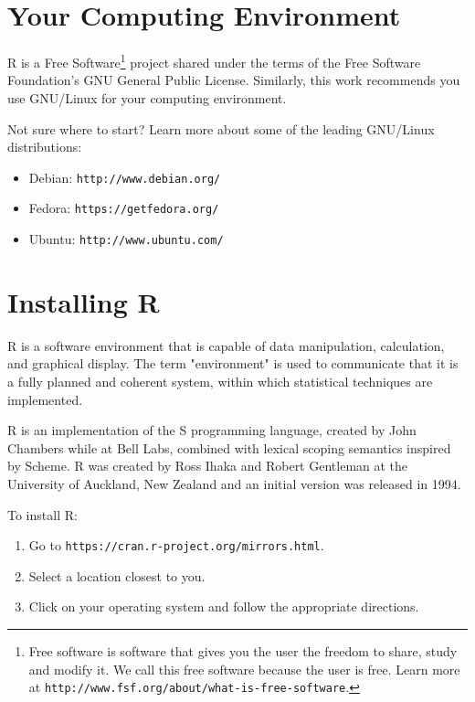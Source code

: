 %
%
%
%
%

\section{Your Computing Environment}
R is a Free Software\footnote{Free software is software that gives you the user the freedom to share, study and modify it. We call this free software because the user is free. Learn more at \texttt{http://www.fsf.org/about/what-is-free-software}.} project shared under the terms of the Free Software Foundation's GNU General Public License. Similarly, this work recommends you use GNU/Linux for your computing environment. 

Not sure where to start? Learn more about some of the leading GNU/Linux distributions:

\begin{itemize}
 \item Debian: \texttt{http://www.debian.org/}
 \item Fedora: \texttt{https://getfedora.org/}
 \item Ubuntu: \texttt{http://www.ubuntu.com/}
\end{itemize}

\section{Installing R}
R is a software environment that is capable of data manipulation, calculation, and graphical display. The term "environment" is used to communicate that it is a fully planned and coherent system, within which statistical techniques are implemented.

R is an implementation of the S programming language, created by John Chambers while at Bell Labs, combined with lexical scoping semantics inspired by Scheme. R was created by Ross Ihaka and Robert Gentleman at the University of Auckland, New Zealand and an initial version was released in 1994.

To install R:

\begin{enumerate}
 \item Go to \texttt{https://cran.r-project.org/mirrors.html}.
 \item Select a location closest to you.
 \item Click on your operating system and follow the appropriate directions.
\end{enumerate}

